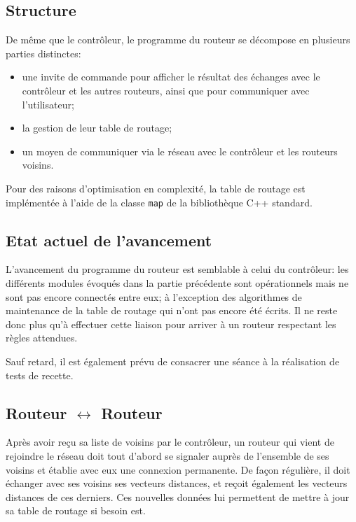 \documentclass[a4paper,11pt]{article}
\begin{document}
\subsection{Structure}

De même que le contrôleur, le programme du routeur se décompose en plusieurs parties distinctes:
\begin{itemize}
\item une invite de commande pour afficher le résultat des échanges avec le contrôleur et les autres routeurs, ainsi que pour communiquer avec l'utilisateur;
\item la gestion de leur table de routage;
\item un moyen de communiquer via le réseau avec le contrôleur et les routeurs voisins.
\end{itemize}

Pour des raisons d'optimisation en complexité, la table de routage est implémentée à l'aide de la classe \texttt{map} de la bibliothèque C++ standard.

\subsection{Etat actuel de l'avancement}

L'avancement du programme du routeur est semblable à celui du contrôleur: les différents modules évoqués dans la partie précédente sont opérationnels mais ne sont pas encore connectés entre eux; à l'exception des algorithmes de maintenance de la table de routage qui n'ont pas encore été écrits. Il ne reste donc plus qu'à effectuer cette liaison pour arriver à un routeur respectant les règles attendues.

Sauf retard, il est également prévu de consacrer une séance à la réalisation de tests de recette.

\subsection{Routeur $\leftrightarrow$ Routeur}

Après avoir reçu sa liste de voisins par le contrôleur, un routeur qui vient de rejoindre le réseau doit tout d'abord se signaler auprès de l'ensemble de ses voisins et établie avec eux une connexion permanente. De façon régulière, il doit échanger avec ses voisins ses vecteurs distances, et reçoit également les vecteurs distances de ces derniers. Ces nouvelles données lui permettent de mettre à jour sa table de routage si besoin est.
\end{document}

